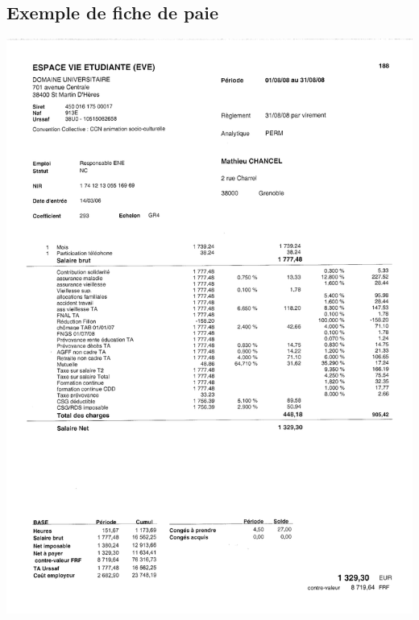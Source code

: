 \subsection{Exemple de fiche de paie}
\begin{center}
\includegraphics[scale=0.7]{annexes/images/fiche_paye_mat.pdf}
\end{center}

